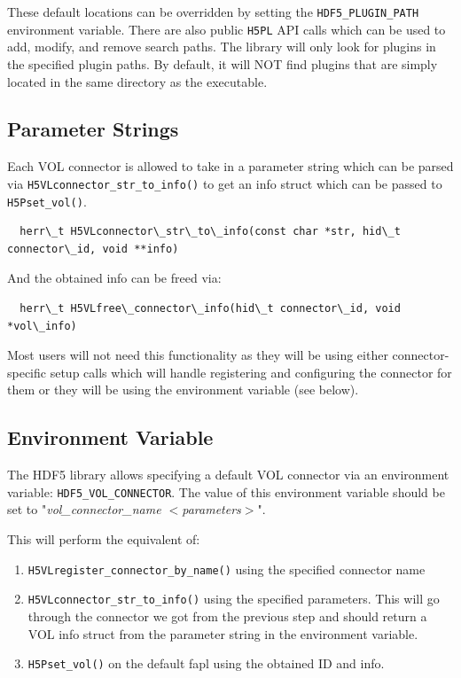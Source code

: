 These default locations can be overridden by setting the {\tt HDF5\_PLUGIN\_PATH} environment variable. There are also public {\tt H5PL} API calls which can be used to add, modify, and remove search paths. The library will only look for plugins in the specified plugin paths. By default, it will NOT find plugins that are simply located in the same directory as the executable.

\subsection{Parameter Strings}

Each VOL connector is allowed to take in a parameter string which can be parsed via {\tt H5VLconnector\_str\_to\_info()} to get an info struct which can be passed to {\tt H5Pset\_vol()}.

\begin{lstlisting}
  herr\_t H5VLconnector\_str\_to\_info(const char *str, hid\_t connector\_id, void **info)
\end{lstlisting}

And the obtained info can be freed via:

\begin{lstlisting}
  herr\_t H5VLfree\_connector\_info(hid\_t connector\_id, void *vol\_info)
\end{lstlisting}

Most users will not need this functionality as they will be using either connector-specific setup calls which will handle registering and configuring the connector for them or they will be using the environment variable (see below).

\subsection{Environment Variable}

The HDF5 library allows specifying a default VOL connector via an environment variable: {\tt HDF5\_VOL\_CONNECTOR}. The value of this environment variable should be set to "\textit{vol\_connector\_name $<$parameters$>$}".

This will perform the equivalent of:

\begin{enumerate}
    \item {\tt H5VLregister\_connector\_by\_name()} using the specified connector name
    \item {\tt H5VLconnector\_str\_to\_info()} using the specified parameters. This will go through the connector we got from the previous step and should return a VOL info struct from the parameter string in the environment variable.
    \item {\tt H5Pset\_vol()} on the default fapl using the obtained ID and info.
\end{enumerate}

